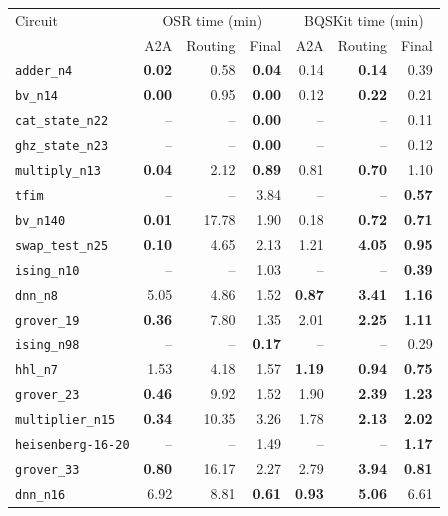 \begin{table}[p]
\centering
\scriptsize
\begin{tabular}{l|rrr|rrr}
\hline
Circuit & \multicolumn{3}{c|}{OSR time (min)} & \multicolumn{3}{c}{BQSKit time (min)} \\
 & A2A & Routing & Final & A2A & Routing & Final \\
\hline
\texttt{adder\_n4} & \textbf{0.02} & 0.58 & \textbf{0.04} & 0.14 & \textbf{0.14} & 0.39 \\
\texttt{bv\_n14} & \textbf{0.00} & 0.95 & \textbf{0.00} & 0.12 & \textbf{0.22} & 0.21 \\
\texttt{cat\_state\_n22} & -- & -- & \textbf{0.00} & -- & -- & 0.11 \\
\texttt{ghz\_state\_n23} & -- & -- & \textbf{0.00} & -- & -- & 0.12 \\
\texttt{multiply\_n13} & \textbf{0.04} & 2.12 & \textbf{0.89} & 0.81 & \textbf{0.70} & 1.10 \\
\texttt{tfim} & -- & -- & 3.84 & -- & -- & \textbf{0.57} \\
\texttt{bv\_n140} & \textbf{0.01} & 17.78 & 1.90 & 0.18 & \textbf{0.72} & \textbf{0.71} \\
\texttt{swap\_test\_n25} & \textbf{0.10} & 4.65 & 2.13 & 1.21 & \textbf{4.05} & \textbf{0.95} \\
\texttt{ising\_n10} & -- & -- & 1.03 & -- & -- & \textbf{0.39} \\
\texttt{dnn\_n8} & 5.05 & 4.86 & 1.52 & \textbf{0.87} & \textbf{3.41} & \textbf{1.16} \\
\texttt{grover\_19} & \textbf{0.36} & 7.80 & 1.35 & 2.01 & \textbf{2.25} & \textbf{1.11} \\
\texttt{ising\_n98} & -- & -- & \textbf{0.17} & -- & -- & 0.29 \\
\texttt{hhl\_n7} & 1.53 & 4.18 & 1.57 & \textbf{1.19} & \textbf{0.94} & \textbf{0.75} \\
\texttt{grover\_23} & \textbf{0.46} & 9.92 & 1.52 & 1.90 & \textbf{2.39} & \textbf{1.23} \\
\texttt{multiplier\_n15} & \textbf{0.34} & 10.35 & 3.26 & 1.78 & \textbf{2.13} & \textbf{2.02} \\
\texttt{heisenberg-16-20} & -- & -- & 1.49 & -- & -- & \textbf{1.17} \\
\texttt{grover\_33} & \textbf{0.80} & 16.17 & 2.27 & 2.79 & \textbf{3.94} & \textbf{0.81} \\
\texttt{dnn\_n16} & 6.92 & 8.81 & \textbf{0.61} & \textbf{0.93} & \textbf{5.06} & 6.61 \\

\end{tabular}
\end{table}
